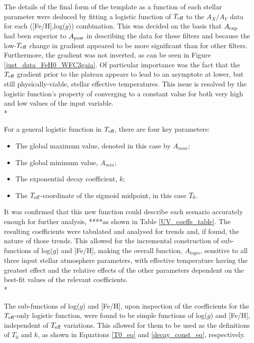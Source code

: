 \documentclass[12pt, a4paper]{report}
\begin{document}
The details of the final form of the template as a function of each stellar parameter were deduced by fitting a logistic function of $T_{\textnormal{eff}}$ to the $A_{X}/A_{V}$ data for each ([Fe/H],log($g$)) combination. This was decided on the basis that $A_{\textnormal{exp}}$ had been superior to $A_{\textnormal{pow}}$ in describing the data for these filters and because the low-$T_{\textnormal{eff}}$ change in gradient appeared to be more significant than for other filters. Furthermore, the gradient was not inverted, as can be seen in Figure \ref{just_data_FeH0_WFC3gaia}. Of particular importance was the fact that the $T_{\textnormal{eff}}$ gradient prior to the plateau appears to lead to an asymptote at lower, but still physically-viable, stellar effective temperatures. This issue is resolved by the logistic function's property of converging to a constant value for both very high and low values of the input variable. \\*

For a general logistic function in $T_{\textnormal{eff}}$, there are four key parameters:
\begin{itemize}
\item The global maximum value, denoted in this case by $A_{max}$;
\item The global minimum value, $A_{min}$;
\item The exponential decay coefficient, $k$;
\item The $T_{\textnormal{eff}}$-coordinate of the sigmoid midpoint, in this case $T_{\textnormal{0}}$.
\end{itemize}

It was confirmed that this new function could describe each scenario accurately enough for further analysis, ****as shown in Table \ref{UV_coeffs_table}. The resulting coefficients were tabulated and analysed for trends and, if found, the nature of those trends. This allowed for the incremental construction of sub-functions of log($g$) and [Fe/H], making the overall function, $A_{logis}$, sensitive to all three input stellar atmosphere parameters, with effective temperature having the greatest effect and the relative effects of the other parameters dependent on the best-fit values of the relevant coefficients.\\*

The sub-functions of log($g$) and [Fe/H], upon inspection of the coefficients for the $T_{\textnormal{eff}}$-only logistic function, were found to be simple functions of log($g$) and [Fe/H], independent of $T_{\textnormal{eff}}$ variations. This allowed for them to be used as the definitions of $T_{0}$ and $k$, as shown in Equations \ref{T0_eq} and \ref{decay_const_eq}, respectively.
\end{document}

